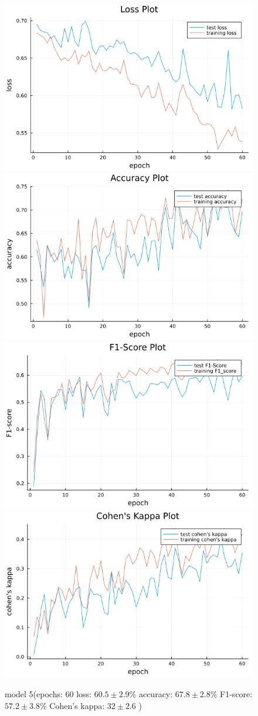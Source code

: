 \documentclass[
a4paper, 
12pt,
grayscalebody, %
abstract=on,
twoside, BCOR10mm, 12pt, DIV13,headinclude, footexclude, final, abstracton, openright
]{ibireprt}
\numberwithin{equation}{chapter}
\numberwithin{table}{chapter}
\numberwithin{figure}{chapter}
\numberwithin{algorithm}{chapter}
\numberwithin{example}{chapter}
\numberwithin{example}{chapter}
\begin{document}
\begin{figure}
	\includegraphics[width=0.4\linewidth]{loss_png_final_2_1.png}\hfill
	\includegraphics[width=0.4\linewidth]{accuracy_png_final_2_1.png}
	\\[\smallskipamount]
	\includegraphics[width=0.4\linewidth]{f1_score_png_final_2_1.png}\hfill
	\includegraphics[width=0.4\linewidth]{cohens_kappa_png_final_2_1.png}
	\caption{model 5(epochs: 60 loss: $60.5\pm2.9\% $ accuracy: $67.8\pm2.8\%$ F1-score: $57.2\pm3.8\%$  Cohen's kappa: $32\pm2.6$ )}
	\label{fig:model_5_60}
\end{figure}
\end{document}
